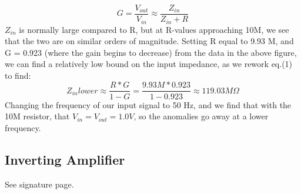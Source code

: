 \documentclass{article}
\begin{document}
    \begin{equation}
        G = \frac{V_{out}}{V_{in}} \approx \frac{Z_{in}}{Z_{in} + R}
    \end{equation}
    $Z_{in}$ is normally large compared to R, but at R-values approaching 10M, we see that the two are on similar orders of magnitude. Setting R equal to 9.93 M, and G = 0.923 (where the gain begins to decrease) from the data in the above figure, we can find a relatively low bound on the input impedance, as we rework eq.(1) to find:
    \begin{equation}
        Z_{in}lower \approx \frac{R*G}{1-G} = \frac{9.93M * 0.923}{1-0.923} \approx 119.03 M\Omega
    \end{equation}
    Changing the frequency of our input signal to 50 Hz, and we find that with the 10M resistor, that $V_{in} = V_{out} = 1.0V$, so the anomalies go away at a lower frequency.
\subsection{Inverting Amplifier}
    See signature page.
\end{document}
